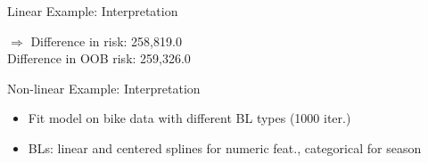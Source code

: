 \documentclass[10pt,compress,t,notes=noshow, xcolor=table]{beamer}
\begin{document}
\begin{frame}{Linear Example: Interpretation}
\begin{center}
\scriptsize
$\Rightarrow$ Difference in risk: 258,819.0\\
Difference in OOB risk: 259,326.0\\

\end{center}

\end{frame}


\begin{frame}{Non-linear Example: Interpretation}

\begin{itemize}
    \item Fit model on bike data with different BL types (1000 iter.) %
    \item BLs: linear and centered splines for numeric feat., categorical for season
\end{itemize}
\begin{columns}[T, totalwidth = \textwidth]
\end{columns}
\end{frame}
\end{document}
